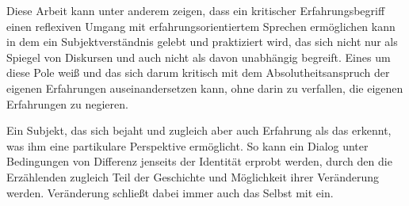Diese Arbeit kann unter anderem zeigen, dass ein kritischer Erfahrungsbegriff
einen reflexiven Umgang mit erfahrungsorientiertem Sprechen ermöglichen kann in
dem ein Subjektverständnis gelebt und praktiziert wird, das sich nicht nur als
Spiegel von Diskursen und auch nicht als davon unabhängig begreift. Eines um
diese Pole weiß und das sich darum kritisch mit dem Absolutheitsanspruch der
eigenen Erfahrungen auseinandersetzen kann, ohne darin zu verfallen, die eigenen
Erfahrungen zu negieren.

Ein Subjekt, das sich bejaht und zugleich aber auch Erfahrung als das erkennt,
was ihm eine partikulare Perspektive ermöglicht. So kann ein Dialog unter
Bedingungen von Differenz jenseits der Identität erprobt werden, durch den die
Erzählenden zugleich Teil der Geschichte und Möglichkeit ihrer Veränderung
werden. Veränderung schließt dabei immer auch das Selbst mit ein.
